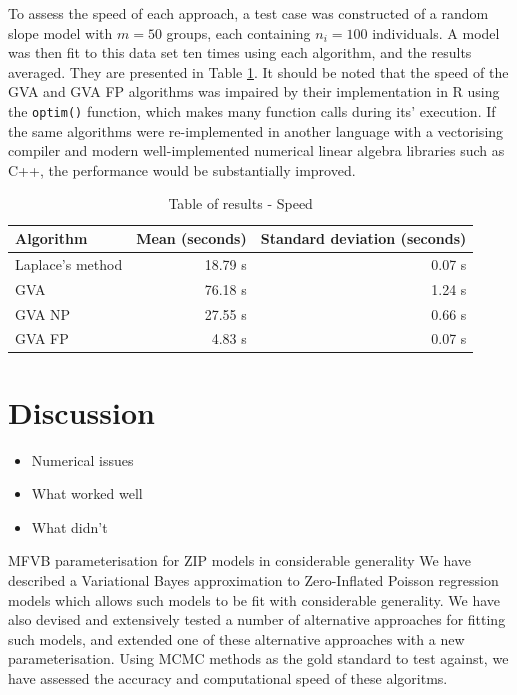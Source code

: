 \documentclass{article}[12pt]
\begin{document}
To assess the speed of each approach, a test case was constructed of a random slope model with $m=50$ groups,
each containing $n_i = 100$ individuals. A model was then fit to this data set ten times using each algorithm,
and the results averaged. They are presented in Table \ref{tab:application_slope_speed}. It should be noted
that the speed of the GVA and GVA FP algorithms was impaired by their implementation in R using the
\texttt{optim()} function, which makes many function calls during its' execution. If the same algorithms were
re-implemented in another language with a vectorising compiler and modern well-implemented numerical linear
algebra libraries such as C++, the performance would be substantially improved.

\begin{table}
\caption{Table of results - Speed}
\label{tab:application_slope_speed}
\begin{tabular}{|l|rr|}
\hline
Algorithm & Mean (seconds) & Standard deviation (seconds) \\
\hline
Laplace's method & 18.79 s & 0.07 s \\
GVA & 76.18 s & 1.24 s \\
GVA NP & 27.55 s & 0.66 s \\
GVA FP & 4.83 s & 0.07 s \\
\hline
\end{tabular}
\end{table}

\section{Discussion}
\label{sec:discussion}
\begin{itemize}
\item Numerical issues
\item What worked well
\item What didn't
\end{itemize}

MFVB parameterisation for ZIP models in considerable generality We have described a Variational Bayes
approximation to Zero-Inflated Poisson regression models which allows such models to be fit with considerable
generality. We have also devised and extensively tested a number of alternative approaches for fitting such
models, and extended one of these alternative approaches with a new parameterisation. Using MCMC methods as
the gold standard to test against, we have assessed the accuracy and computational speed of these algoritms.
\end{document}
